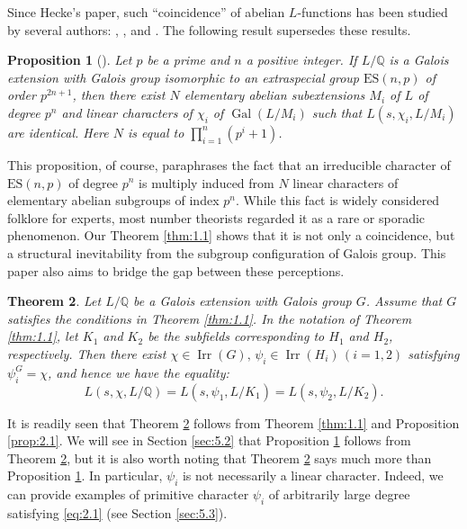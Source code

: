 \documentclass[a4paper,12pt]{article}
\newcommand{\field}[1]{\mathbb{#1}}
\newcommand{\Q}{\field{Q}}
\newtheorem{theorem}{Theorem}[section]
\newtheorem{proposition}[theorem]{Proposition}
\theoremstyle{definition}
\theoremstyle{remark}
\DeclareMathOperator{\gal}{Gal}
\DeclareMathOperator{\irr}{Irr}
\numberwithin{equation}{section}
\begin{document}
Since Hecke's paper, such ``coincidence'' of abelian $L$-functions has been studied by several authors:
\cite{MR914305}, \cite{MR3581913}, and \cite{MR4474773}.
The following result supersedes these results.
 
\begin{proposition}[] \label{prop:2.2}
Let $p$ be a prime and $n$ a positive integer. If $L/\Q$ is a Galois
extension with Galois group isomorphic to an extraspecial group $\mathrm{ES}(n,p)$ of order
$p^{2n+1}$, then there exist $N$ elementary abelian subextensions $M_i$ of $L$ 
of degree $p^n$ and linear characters of $\chi_i$ of $\gal (L/M_i)$
such that $L (s,  \chi_i, L/M_i)$ are identical.
Here $N$ is equal to $\prod_{i=1}^n (p^i +1)$.
\end{proposition}

This proposition, of course, paraphrases the fact that an irreducible character of $\mathrm{ES}(n,p)$ of degree $p^n$ 
is multiply induced from $N$ linear characters of elementary abelian subgroups of index $p^n$.
While this fact is widely considered folklore for experts, most number theorists regarded it as 
a rare or sporadic phenomenon. 
Our Theorem \ref{thm:1.1} shows that it is not only a coincidence, but a structural inevitability from 
the subgroup configuration of Galois group.
This paper also aims to bridge the gap between these perceptions.


\begin{theorem} \label{thm:2.3}
    Let $L/\Q $ be a Galois extension with Galois group $G$.
    Assume that $G$ satisfies the conditions in Theorem \ref{thm:1.1}. In the notation of Theorem \ref{thm:1.1},
    let  $K_1$ and $K_2$ be the subfields corresponding to $H_1$ and $H_2$, respectively.
    Then there exist $\chi \in \irr (G), \, \psi_i \in \irr (H_i) \, (i=1,2)$ satisfying $\psi_i^G = \chi$,
    and hence we have the equality:
    \begin{equation} \label{eq:2.1}
    L (s, \chi, L/\Q ) =L (s, \psi_1, L/K_1) = L (s, \psi_2, L/K_2 ).
    \end{equation}
\end{theorem}

It is readily seen that Theorem \ref{thm:2.3} follows from Theorem \ref{thm:1.1} and Proposition \ref{prop:2.1}.
We will see in Section \ref{sec:5.2} that Proposition \ref{prop:2.2} follows from Theorem \ref{thm:2.3}, but
it is also worth noting that Theorem \ref{thm:2.3} says much more than Proposition \ref{prop:2.2}.
In particular, $\psi_i$ is not necessarily a linear character. Indeed, we can provide
examples of primitive character $\psi_i$ of arbitrarily large degree satisfying \eqref{eq:2.1}
 (see Section \ref{sec:5.3}).
\end{document}
